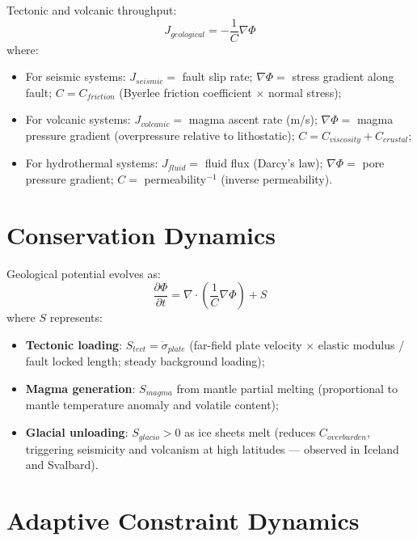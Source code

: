 \documentclass[11pt]{article}
\begin{document}
Tectonic and volcanic throughput:
\begin{equation}
J_{geological} = -\frac{1}{C}\nabla \Phi
\end{equation}
where:
\begin{itemize}
    \item For seismic systems: $J_{seismic} = $ fault slip rate; $\nabla\Phi = $ stress gradient
          along fault; $C = C_{friction}$ (Byerlee friction coefficient $\times$ normal stress);
    \item For volcanic systems: $J_{volcanic} = $ magma ascent rate (m/s); $\nabla\Phi = $ magma
          pressure gradient (overpressure relative to lithostatic); $C = C_{viscosity} + C_{crustal}$;
    \item For hydrothermal systems: $J_{fluid} = $ fluid flux (Darcy's law); $\nabla\Phi = $ pore
          pressure gradient; $C = $ permeability$^{-1}$ (inverse permeability).
\end{itemize}

\section{Conservation Dynamics}

Geological potential evolves as:
\begin{equation}
\frac{\partial \Phi}{\partial t} = \nabla \cdot \left(\frac{1}{C}\nabla \Phi\right) + S
\end{equation}
where $S$ represents:
\begin{itemize}
    \item \textbf{Tectonic loading}: $S_{tect} = \dot{\sigma}_{plate}$ (far-field plate velocity
          $\times$ elastic modulus / fault locked length; steady background loading);
    \item \textbf{Magma generation}: $S_{magma}$ from mantle partial melting (proportional to
          mantle temperature anomaly and volatile content);
    \item \textbf{Glacial unloading}: $S_{glacio} > 0$ as ice sheets melt (reduces $C_{overburden}$,
          triggering seismicity and volcanism at high latitudes --- observed in Iceland and Svalbard).
\end{itemize}

\section{Adaptive Constraint Dynamics}
\end{document}
